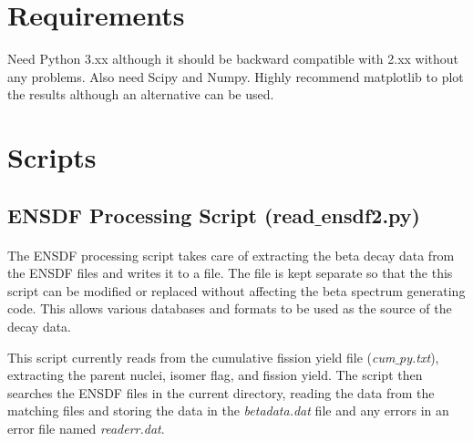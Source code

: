 \documentclass{report}
\begin{document}
\section{Requirements}
Need Python 3.xx although it should be backward compatible with 2.xx without any problems. Also need Scipy and 
Numpy. Highly recommend matplotlib to plot the results although an alternative can be used.

\section{Scripts}
\subsection{ENSDF Processing Script (read$\_$ensdf2.py)}
\paragraph{}
The ENSDF processing script takes care of extracting the beta decay data from the ENSDF files and 
writes it to a file. The file is kept separate so that the this script can be modified or replaced without affecting the beta 
spectrum generating code. This allows various databases and formats to be used as the source
of the decay data. 

This script currently reads from the cumulative fission yield file (\textit{cum$\_$py.txt}), extracting the
 parent nuclei, isomer flag, and fission yield. The script then searches the ENSDF files in the current directory, reading the 
data from the matching files and storing the data in the \textit{betadata.dat} file and any errors in an error file named \textit{readerr.dat}. 
\end{document}
